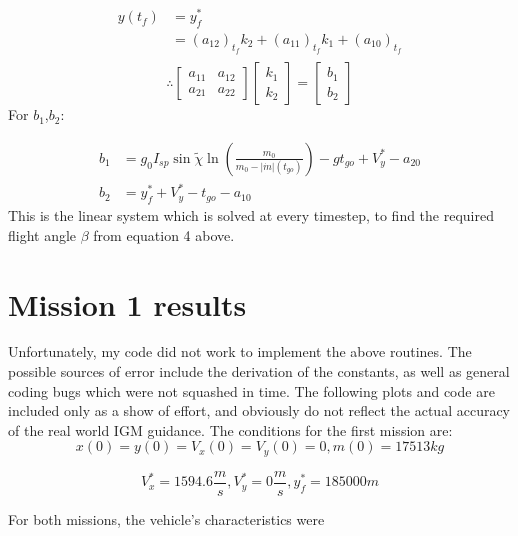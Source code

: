 \documentclass{article}
\begin{document}
\begin{align*}
y(t_f) &= y_f^* \\
& = \left (a_{12}  \right )_{t_f} k_2 +\left (a_{11}  \right )_{t_f} k_1 + \left (a_{10}  \right )_{t_f} \\
\end{align*}
\begin{equation*}
\therefore
\begin{bmatrix} a_{11} & a_{12} \\ a_{21} & a_{22} \end{bmatrix}
\begin{bmatrix} k_1 \\k_2 \end{bmatrix}
=\begin{bmatrix} b_1 \\b_2 \end{bmatrix}
\end{equation*}
For $b_1$,$b_2$: 	

\begin{align*}
b_1 &= g_0I_{sp}\sin\tilde\chi\ln\left(\frac{m_0}{m_0 - |\dot{m}|(t_{go})}\right)  - gt_{go}+ V_y^* - a_{20} \\
b_2 &= y_f^{*} +V_y^*  - t_{go} - a_{10} 
\end{align*}
This is the linear system which is solved at every timestep, to find the required flight angle $\beta$ from equation 4 above. 

\section{Mission 1 results}

Unfortunately, my code did not work to implement the above routines. The possible sources of error include the derivation of the constants, as well as 
general coding bugs which were not squashed in time. The following plots and code are included only as a show of effort, and obviously do not reflect the 
actual accuracy of the real world IGM guidance. 
\newline
The conditions for the first mission are: 
\begin{equation*}
x(0) = y(0) = V_x(0) = V_y(0) = 0 ,m(0) = 17513kg
\end{equation*}

\begin{equation*}
V_x^* = 1594.6 \frac{m}{s}, V_y^* = 0 \frac{m}{s} , y_f^* = 185000 m 
\end{equation*}

For both missions, the vehicle's characteristics were 
\end{document}

